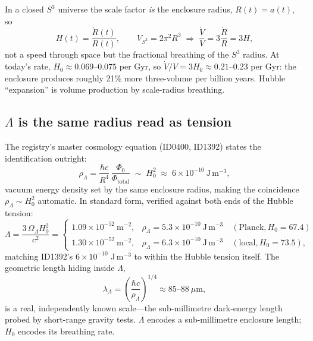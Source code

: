 \documentclass[11pt]{article}
\theoremstyle{remark}
\begin{document}
In a closed $S^3$ universe the scale factor \emph{is} the enclosure radius, $R(t) = a(t)$, so
\begin{equation}
H(t) = \frac{\dot{R}(t)}{R(t)}, \qquad V_{S^3} = 2\pi^2 R^3 \;\Longrightarrow\; \frac{\dot{V}}{V} = 3\frac{\dot{R}}{R} = 3H,
\label{eq:breathing}
\end{equation}
not a speed through space but the fractional breathing of the $S^3$ radius. At today's rate, $H_0 \approx 0.069$--$0.075$ per Gyr, so $\dot{V}/V = 3H_0 \approx 0.21$--$0.23$ per Gyr: the enclosure produces roughly 21\% more three-volume per billion years. Hubble ``expansion'' is volume production by scale-radius breathing.

\subsection{\texorpdfstring{$\Lambda$ is the same radius read as tension}{Lambda is the same radius read as tension}}

The registry's master cosmology equation (ID0400, ID1392) states the identification outright:
\begin{equation}
\rho_\Lambda = \frac{\hbar c}{R^4}\, \frac{\Phi_0}{\Phi_{\mathrm{total}}} \;\sim\; H_0^2 \;\approx\; 6 \times 10^{-10}\ \mathrm{J\,m^{-3}},
\label{eq:lambdamaster}
\end{equation}
vacuum energy density set by the same enclosure radius, making the coincidence $\rho_\Lambda \sim H_0^2$ automatic. In standard form, verified against both ends of the Hubble tension:
\begin{equation}
\Lambda = \frac{3\, \Omega_\Lambda H_0^2}{c^2} =
\begin{cases}
1.09 \times 10^{-52}\ \mathrm{m^{-2}}, & \rho_\Lambda = 5.3 \times 10^{-10}\ \mathrm{J\,m^{-3}} \quad (\text{Planck}, H_0 = 67.4) \\
1.30 \times 10^{-52}\ \mathrm{m^{-2}}, & \rho_\Lambda = 6.3 \times 10^{-10}\ \mathrm{J\,m^{-3}} \quad (\text{local}, H_0 = 73.5),
\end{cases}
\end{equation}
matching ID1392's $6 \times 10^{-10}$ J\,m$^{-3}$ to within the Hubble tension itself. The geometric length hiding inside $\Lambda$,
\begin{equation}
\lambda_\Lambda = \left( \frac{\hbar c}{\rho_\Lambda} \right)^{1/4} \approx 85\text{--}88\ \mu\mathrm{m},
\label{eq:delength}
\end{equation}
is a real, independently known scale---the sub-millimetre dark-energy length probed by short-range gravity tests. $\Lambda$ encodes a sub-millimetre enclosure length; $H_0$ encodes its breathing rate.
\end{document}
